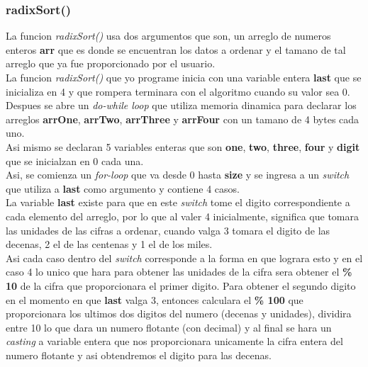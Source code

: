 \documentclass{article}
\begin{document}
			\subsubsection{radixSort()}
			
				La funcion \emph{radixSort()} usa dos argumentos que son, un arreglo de numeros enteros \textbf{arr} que es donde se encuentran los datos a ordenar y el tamano de tal arreglo que ya fue proporcionado por el usuario.\\
				
				La funcion \emph{radixSort()} que yo programe inicia con una variable entera \textbf{last} que se inicializa en 4 y que rompera terminara con el algoritmo cuando su valor sea 0.\\
				
				Despues se abre un \emph{do-while loop} que utiliza memoria dinamica para declarar los arreglos \textbf{arrOne}, \textbf{arrTwo}, \textbf{arrThree} y \textbf{arrFour} con un tamano de 4 bytes cada uno.\\
				
				Asi mismo se declaran 5 variables enteras que son \textbf{one}, \textbf{two}, \textbf{three}, \textbf{four} y \textbf{digit} que se inicialzan en 0 cada una.\\
				
				Asi, se comienza un \emph{for-loop} que va desde 0 hasta \textbf{size} y se ingresa a un \emph{switch} que utiliza a \textbf{last} como argumento y contiene 4 casos.\\
				
				La variable \textbf{last} existe para que en este \emph{switch} tome el digito correspondiente a cada elemento del arreglo, por lo que al valer 4 inicialmente, significa que tomara las unidades de las cifras a ordenar, cuando valga 3 tomara el digito de las decenas, 2 el de las centenas y 1 el de los miles.\\
				
				Asi cada caso dentro del \emph{switch} corresponde a la forma en que lograra esto y en el caso 4 lo unico que hara para obtener las unidades de la cifra sera obtener el \textbf{\% 10} de la cifra que proporcionara el primer digito. Para obtener el segundo digito en el momento en que \textbf{last} valga 3, entonces calculara el \textbf{\% 100} que proporcionara los ultimos dos digitos del numero (decenas y unidades), dividira entre 10 lo que dara un numero flotante (con decimal) y al final se hara un \emph{casting} a variable entera que nos proporcionara unicamente la cifra entera del numero flotante y asi obtendremos el digito para las decenas.\\
				
\end{document}

